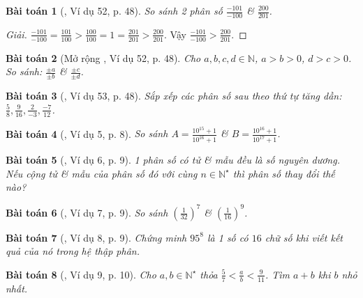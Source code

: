 \documentclass{article}
\newtheorem{baitoan}{Bài toán}
\begin{document}
\begin{baitoan}[\cite{Tuyen_Toan_6}, Ví dụ 52, p. 48]
	So sánh 2 phân số $\frac{-101}{-100}$ \& $\frac{200}{201}$.
\end{baitoan}

\begin{proof}[Giải]
	$\frac{-101}{-100} = \frac{101}{100} > \frac{100}{100} = 1 = \frac{201}{201} > \frac{200}{201}$. Vậy $\frac{-101}{-100} > \frac{200}{201}$.
\end{proof}

\begin{baitoan}[Mở rộng \cite{Tuyen_Toan_6}, Ví dụ 52, p. 48]
	Cho $a,b,c,d\in\mathbb{N}$, $a > b > 0$, $d > c > 0$. So sánh: $\frac{\pm a}{\pm b}$ \& $\frac{\pm c}{\pm d}$.
\end{baitoan}

\begin{baitoan}[\cite{Tuyen_Toan_6}, Ví dụ 53, p. 48]
	Sắp xếp các phân số sau theo thứ tự tăng dần: $\frac{5}{8},\frac{9}{16},\frac{2}{-3},\frac{-7}{12}$.
\end{baitoan}

\begin{baitoan}[\cite{Binh_Toan_6_tap_2}, Ví dụ 5, p. 8]
	So sánh $A = \frac{10^{15} + 1}{10^{16} + 1}$ \& $B = \frac{10^{16} + 1}{10^{17} + 1}$.
\end{baitoan}

\begin{baitoan}[\cite{Binh_Toan_6_tap_2}, Ví dụ 6, p. 9]
	1 phân số có tử \& mẫu đều là số nguyên dương. Nếu cộng tử \& mẫu của phân số đó với cùng $n\in\mathbb{N}^\star$ thì phân số thay đổi thế nào?
\end{baitoan}

\begin{baitoan}[\cite{Binh_Toan_6_tap_2}, Ví dụ 7, p. 9]
	So sánh $\left(\frac{1}{32}\right)^7$ \& $\left(\frac{1}{16}\right)^9$.
\end{baitoan}

\begin{baitoan}[\cite{Binh_Toan_6_tap_2}, Ví dụ 8, p. 9]
	Chứng minh $95^8$ là 1 số có $16$ chữ số khi viết kết quả của nó trong hệ thập phân.
\end{baitoan}

\begin{baitoan}[\cite{Binh_Toan_6_tap_2}, Ví dụ 9, p. 10]
	Cho $a,b\in\mathbb{N}^\star$ thỏa $\frac{5}{7} < \frac{a}{b} < \frac{9}{11}$. Tìm $a + b$ khi $b$ nhỏ nhất.
\end{baitoan}
\end{document}
